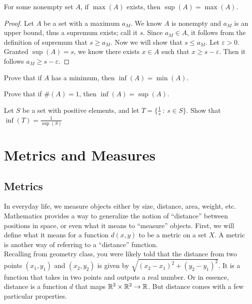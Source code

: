 \begin{theorem}
    For some nonempty set $A$, if $\max(A)$ exists, then $\sup(A)=\max(A)$. 
\end{theorem}
\begin{proof}
    Let $A$ be a set with a maximum $a_M$. We know $A$ is nonempty and $a_M$ is an upper bound, thus a supremum exists; call it $s$. Since $a_M\in A$, it follows from the definition of supremum that $s\geq a_M$. Now we will show that $s\leq a_M$. Let $\varepsilon >0$. Granted $\sup(A)=s$, we know there exists $x\in A$ such that $x\geq s-\varepsilon$. Then it follows $a_M \geq s-\varepsilon$.
\end{proof}

\begin{exercise}
    Prove that if $A$ has a minimum, then $\inf(A)=\min(A)$.
\end{exercise}

\begin{exercise}
    Prove that if $\#(A)=1$, then $\inf(A)=\sup(A)$.
\end{exercise}

\begin{exercise}
    Let $S$ be a set with positive elements, and let $T=\{\frac{1}{s}\ :\ s\in S\}$. Show that $\inf(T)=\frac{1}{\sup(S)}$ 
\end{exercise}

\clearpage

\section{Metrics and Measures}

\subsection{Metrics}


In everyday life, we measure objects either by size, distance, area, weight, etc. Mathematics provides a way to generalize the notion of ``distance'' between positions in space, or even what it means to ``measure'' objects. First, we will define what it means for a function $d(x,y)$ to be a metric on a set $X$. A metric is another way of referring to a ``distance'' function.\\

Recalling from geometry class, you were likely told that the distance from two points $(x_1,y_1)$ and $(x_2,y_2)$ is given by $\sqrt{(x_2-x_1)^2+(y_2-y_1)^2}$. It is a function that takes in two points and outputs a real number. Or in essence, distance is a function $d$ that maps $\mathbb{R}^2\times\mathbb{R}^2\to\mathbb{R}$. But distance comes with a few particular properties. 

